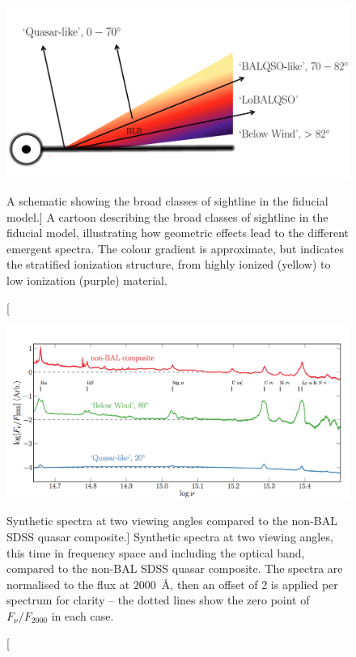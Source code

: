 \begin{figure} 
\centering
\includegraphics[width=1.0\textwidth]{figures/06-agnpaper/fig4.png}
\caption
[A schematic showing the broad classes of sightline 
in the fiducial model.]
{
A cartoon describing the broad classes of sightline 
in the fiducial model, illustrating how geometric effects lead to 
the different emergent spectra. The colour gradient is approximate,
but indicates the stratified ionization structure, 
from highly ionized (yellow) to low ionization (purple) material.
}
\label{fig:sightline}
\end{figure} 

\begin{figure}
\centering
\includegraphics[width=0.9\textheight, angle=270]
{figures/06-agnpaper/fig5.png}
\caption
[Synthetic spectra at two viewing angles compared to the non-BAL SDSS quasar composite.]
{
Synthetic spectra at two viewing angles, 
this time in frequency space and including the optical band,
compared to the non-BAL SDSS quasar composite. The spectra are normalised to the flux at 
$2000$~\AA, then an offset of 2 is applied per spectrum for clarity -- the dotted lines show the zero point of $F_\nu / F_{2000}$ in each case.
}
\label{fig:sed}
\end{figure}

